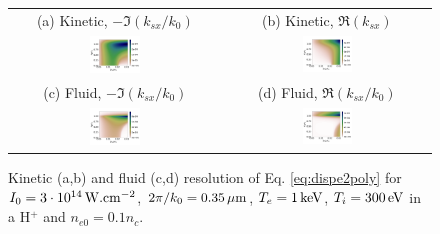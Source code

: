 \documentclass[
 reprint,
 amsmath,amssymb,
 aps,
]{revtex4-1}
\begin{document}
\begin{figure}
\begin{tabular}{cc}
(a) Kinetic, $-\Im(k_{sx}/k_0)$ &
(b)  Kinetic, $\Re(k_{sx})$ \\
\includegraphics[width=0.25\textwidth]{G_Te1keV_Ti300_3e14_3w_1e-1nc_Hp.png}&
\includegraphics[width=0.25\textwidth]{k_Te1keV_Ti300_3e14_3w_1e-1nc_Hp.png}\\
(c) Fluid, $-\Im(k_{sx}/k_0)$  &
(d) Fluid, $\Re(k_{sx}/k_0)$  \\
\includegraphics[width=0.25\textwidth]{Gf_Te1keV_Ti300_3e14_3w_1e-1nc_Hp.png}&
\includegraphics[width=0.25\textwidth]{kf_Te1keV_Ti300_3e14_3w_1e-1nc_Hp.png}
\end{tabular}
\caption{ \label{fig:dispe}  
Kinetic (a,b) and fluid (c,d) resolution of Eq. \eqref{eq:dispe2poly} for  $I_0 = 3\cdot 10^{14}\, \rm W.cm^{-2}$, $2\pi/k_0=0.35 \,\rm\mu m$, $T_e =1\,\rm  keV$, $ T_i=300\,  \rm eV$ in a H$^+$ and $n_{e0}=0.1n_c$.
 }
\end{figure}
\end{document}
